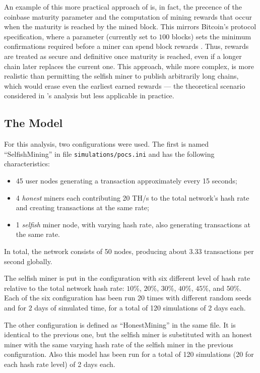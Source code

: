 An example of this more practical approach of \iblock{} is, in fact, the
precence of the coinbase maturity parameter and the computation of mining
rewards that occur when the maturity is reached by the mined block. This
mirrors Bitcoin's protocol specification, where a 
parameter (currently set to \(100\) blocks) sets the minimum confirmations
required before a miner can spend block rewards \cite[Chapter~``Coinbase
Transaction'']{learnmeabitcoin}. Thus, rewards are treated as secure and
definitive once maturity is reached, even if a longer chain later replaces the
current one. This approach, while more complex, is more realistic than
permitting the selfish miner to publish arbitrarily long chains, which would
erase even the earliest earned rewards --- the theoretical scenario considered
in \citeauthor{selfish-mining}'s analysis but less applicable in practice.

\subsection{The Model}\label{subsec:selfish-model}

For this analysis, two configurations were used. The first is named
``SelfishMining'' in file \texttt{simulations/pocs.ini} and has the following
characteristics:
\begin{itemize}
	\item 45 user nodes generating a transaction approximately every 15
		seconds;
	\item 4 \emph{honest} miners each contributing 20 TH/s to the total
		network's hash rate and creating transactions at the same rate;
	\item 1 \emph{selfish} miner node, with varying hash rate, also
		generating transactions at the same rate.
\end{itemize}

In total, the network consists of 50 nodes, producing about \(3.33\)
transactions per second globally.

The selfish miner is put in the configuration with six different level of
hash rate relative to the total network hash rate: \(10\%\), \(20\%\),
\(30\%\), \(40\%\), \(45\%\), and \(50\%\). Each of the six configuration has
been run 20 times with different random seeds and for 2 days of simulated time,
for a total of 120 simulations of 2 days each.

The other configuration is defined as ``HonestMining'' in the same file. It is
identical to the previous one, but the selfish miner is substituted with an
honest miner with the same varying hash rate of the selfish miner in the
previous configuration. Also this model has been run for a total of 120
simulations (20 for each hash rate level) of 2 days each.

